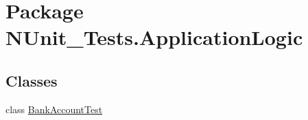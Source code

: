 \hypertarget{namespace_n_unit___tests_1_1_application_logic}{
\section{Package NUnit\_\-Tests.ApplicationLogic}
\label{namespace_n_unit___tests_1_1_application_logic}
}
\subsection*{Classes}
\begin{DoxyCompactItemize}
\item 
class \hyperlink{class_n_unit___tests_1_1_application_logic_1_1_bank_account_test}{BankAccountTest}
\end{DoxyCompactItemize}
